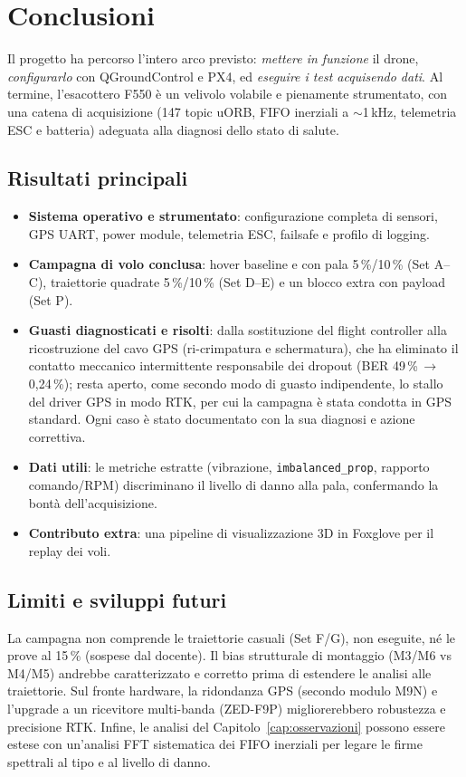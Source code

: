 \chapter{Conclusioni}
\label{cap:conclusioni}

Il progetto ha percorso l'intero arco previsto: \emph{mettere in funzione} il
drone, \emph{configurarlo} con QGroundControl e PX4, ed \emph{eseguire i test
acquisendo dati}. Al termine, l'esacottero F550 \`e un velivolo volabile e
pienamente strumentato, con una catena di acquisizione (147 topic uORB, FIFO
inerziali a $\sim$1\,kHz, telemetria ESC e batteria) adeguata alla diagnosi dello
stato di salute.

\section{Risultati principali}

\begin{itemize}
  \item \textbf{Sistema operativo e strumentato}: configurazione completa di
        sensori, GPS UART, power module, telemetria ESC, failsafe e profilo di
        logging.
  \item \textbf{Campagna di volo conclusa}: hover baseline e con pala 5\,\%/10\,\%
        (Set A--C), traiettorie quadrate 5\,\%/10\,\% (Set D--E) e un blocco extra
        con payload (Set P).
  \item \textbf{Guasti diagnosticati e risolti}: dalla sostituzione del flight
        controller alla ricostruzione del cavo GPS (ri-crimpatura e schermatura),
        che ha eliminato il contatto meccanico intermittente responsabile dei
        dropout (BER 49\,\%\,$\rightarrow$\,0{,}24\,\%); resta aperto, come secondo
        modo di guasto indipendente, lo stallo del driver GPS in modo RTK, per cui
        la campagna \`e stata condotta in GPS standard. Ogni caso \`e stato
        documentato con la sua diagnosi e azione correttiva.
  \item \textbf{Dati utili}: le metriche estratte (vibrazione,
        \texttt{imbalanced\_prop}, rapporto comando/RPM) discriminano il livello
        di danno alla pala, confermando la bont\`a dell'acquisizione.
  \item \textbf{Contributo extra}: una pipeline di visualizzazione 3D in Foxglove
        per il replay dei voli.
\end{itemize}

\section{Limiti e sviluppi futuri}

La campagna non comprende le traiettorie casuali (Set F/G), non eseguite, n\'e le
prove al 15\,\% (sospese dal docente). Il bias strutturale di montaggio
(M3/M6 vs M4/M5) andrebbe caratterizzato e corretto prima di estendere le analisi
alle traiettorie. Sul fronte hardware, la ridondanza GPS (secondo modulo M9N) e
l'upgrade a un ricevitore multi-banda (ZED-F9P) migliorerebbero robustezza e
precisione RTK. Infine, le analisi del Capitolo~\ref{cap:osservazioni} possono
essere estese con un'analisi FFT sistematica dei FIFO inerziali per legare le
firme spettrali al tipo e al livello di danno.
